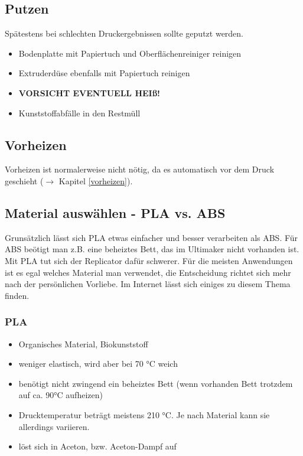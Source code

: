 \documentclass{\basedir/fablab-document}
\begin{document}
\subsection{Putzen} \label{putzen}

Spätestens bei schlechten Druckergebnissen sollte geputzt werden.

\begin{itemize}
 \item Bodenplatte mit Papiertuch und Oberflächenreiniger reinigen
 \item Extruderdüse ebenfalls mit Papiertuch reinigen
 \item \textbf{VORSICHT EVENTUELL HEIß!}
 \item Kunststoffabfälle in den Restmüll
\end{itemize}

\subsection{Vorheizen}
Vorheizen ist normalerweise nicht nötig, da es automatisch vor dem Druck geschieht ($\to$ Kapitel \ref{vorheizen}).

\subsection{Material auswählen - PLA vs. ABS}
Grunsätzlich lässt sich PLA etwas einfacher und besser verarbeiten als ABS. Für ABS beötigt man z.B. eine beheiztes
Bett, das im Ultimaker nicht vorhanden ist. Mit PLA tut sich der Replicator dafür schwerer. Für die meisten 
Anwendungen ist es egal welches Material man verwendet, die Entscheidung richtet sich mehr nach der persönlichen
Vorliebe. Im Internet lässt sich einiges zu diesem Thema finden.

\subsubsection{PLA}
\begin{itemize}
\item Organisches Material, Biokunststoff
\item weniger elastisch, wird aber bei 70 °C weich
\item benötigt nicht zwingend ein beheiztes Bett (wenn vorhanden Bett trotzdem auf ca. 90°C aufheizen)
\item Drucktemperatur beträgt meistens 210 °C. Je nach Material kann sie allerdings variieren.
\item löst sich in Aceton, bzw. Aceton-Dampf auf
\end{itemize}
\end{document}
